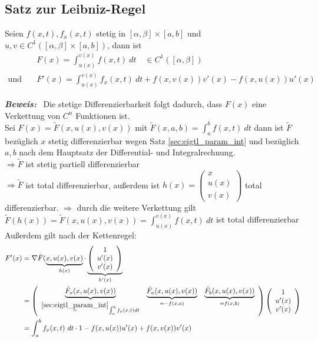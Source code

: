 \documentclass[11pt,a4paper]{book}
\newcommand{\1}    	{\mathbbm{1}}
\newcommand{\Beweis}[1][Beweis]
{\begin{mdframed}[backgroundcolor=gray!10,linewidth=0pt]\noindent\textit{\textbf{{#1}:}}~}
\newcommand{\QED}	{\end{mdframed}}
\begin{document}
\subsection{Satz zur Leibniz-Regel}
Seien \(f(x,t), f_x(x,t)\) stetig in \([\alpha,\beta]\times[a,b]\) und \(u,v \in C^1 ([\alpha,\beta]\times[a,b])\), dann ist
\begin{align*}
	& F(x) = \int_{u(x)}^{v(x)} f(x,t) ~dt \quad \in C^1([\alpha,\beta]) \\
	\textrm{und}\quad& F'(x) = \int_{u(x)}^{v(x)} f_x(x,t) ~dt + f(x, v(x)) v'(x) - f(x,u(x))u'(x)
\end{align*}
\Beweis
	Die stetige Differenzierbarkeit folgt dadurch, dass \(F(x)\) eine Verkettung von \(C^n\) Funktionen ist.\\
	Sei \(F(x) = \tilde{F}(x,u(x),v(x))\) mit \(\tilde{F}(x,a,b) = \int_a^b f(x,t) ~dt\) dann ist \(\tilde{F}\) bezüglich \(x\) stetig differenzierbar wegen Satz \ref{sec:eigtl_param_int} und bezüglich \(a,b\) nach dem Hauptsatz der Differential- und Integralrechnung.\\
	\(\Rightarrow \tilde{F}\) ist stetig partiell differenzierbar\\
	\(\Rightarrow \tilde{F}\) ist total differenzierbar, außerdem ist \(h(x) = \left( \begin{array}{c} x \\ u(x) \\ v(x) \end{array}\right)\) total differenzierbar.
	\(\Rightarrow\) durch die weitere Verkettung gilt \(\tilde{F}(h(x)) = \tilde{F}(x, u(x), v(x))= \int_{u(x)}^{v(x)}f(x,t) ~dt \) ist total differenzierbar \\
	
	\noindent
	Außerdem gilt nach der Kettenregel:
	\begin{align*}
		F'(x) &= \nabla \tilde{F}(\underbrace{x,u(x),v(x)}_{h(x)} \cdot
		\underbrace{ \left( \begin{array}{c}
			1 \\ u'(x) \\ v'(x)		
		\end{array} \right) }_{h'(x)} \\
		&= \left( \begin{array}{ccc}
			\underbrace{\tilde{F}_x(x,u(x),v(x))}_
			{\stackrel{\ref{sec:eigtl_param_int}}{=} \int_a^b f_x(x,t) dt} &
			\underbrace{\tilde{F}_a(x,u(x),v(x))}_
			{= -f(x,a)} &
			\underbrace{\tilde{F}_b(x,u(x),v(x))}_
			{= f(x,b)}
		\end{array} \right)\left( \begin{array}{c}
			1 \\ u'(x) \\ v'(x)		
		\end{array} \right) \\
		&= \int_a^b f_x(x,t) ~dt \cdot 1 - f(x,u(x)) u'(x) + f(x,v(x)) v'(x)
	\end{align*}
\QED
\end{document}
